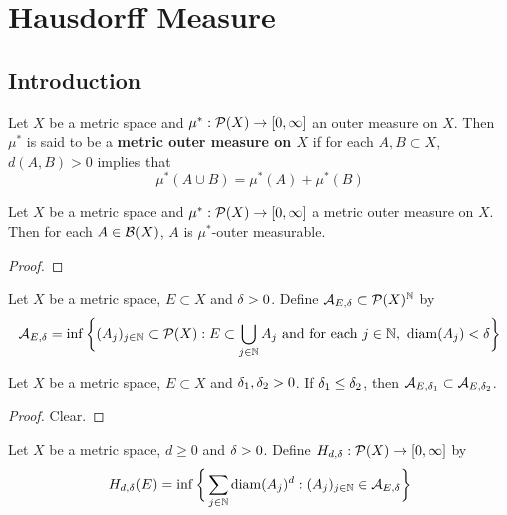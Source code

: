 \documentclass{book}
\begin{document}
	
	
	
	
	
	\newpage
	\chapter{Hausdorff Measure}
	
	\section{Introduction}
	
	\begin{defn}
	Let $X$ be a metric space and $\mu^*: \mathcal{P}(X) \rightarrow [0, \infty]$ an outer measure on $X$. Then $\mu^*$ is said to be a \textbf{metric outer measure on $X$} if for each $A, B \subset X$, $d(A,B) > 0$ implies that 
	\begin{equation*}
	\mu^*(A \cup B) = \mu^*(A) + \mu^*(B)
	\end{equation*}
	\end{defn}	
	
	\begin{ex}
	Let $X$ be a metric space and $\mu^*: \mathcal{P}(X) \rightarrow [0, \infty]$ a metric outer measure on $X$.
	Then for each $A \in \mathcal{B}(X)$, $A$ is $\mu^*$-outer measurable. 
	\end{ex}
	
	\begin{proof}
	
	\end{proof}
	
	
	\begin{defn}
	Let $X$ be a metric space, $E \subset X$ and $\delta >0$. Define $\mathcal{A}_{E, \delta} \subset \mathcal{P}(X)^{\mathbb{N}}$ by 
	\begin{equation*}
	 \mathcal{A}_{E, \delta} = \inf \bigg \{(A_j)_{j \in \mathbb{N}} \subset \mathcal{P}(X): E \subset \bigcup\limits_{j \in \mathbb{N}}A_j \text{ and for each $j \in \mathbb{N}$, } \operatorname{\text{diam}}(A_j) < \delta \bigg \}
	\end{equation*}
	\end{defn}
	
	\begin{ex}
	Let $X$ be a metric space, $E \subset X$ and $\delta_1, \delta_2 >0$. If $\delta_1 \leq \delta_2$, then $\mathcal{A}_{E, \delta_1} \subset \mathcal{A}_{E, \delta_2}$.
	\end{ex}
	
	\begin{proof}
	Clear.
	\end{proof}
	
	\begin{defn}
	Let $X$ be a metric space, $d \geq 0$ and $\delta >0$. Define $H_{d, \delta}: \mathcal{P}(X) \rightarrow [0, \infty]$ by 
	\begin{equation*}
	H_{d, \delta}(E) = \inf \bigg \{\sum\limits_{j \in \mathbb{N}} \operatorname{\text{diam}}(A_j)^d: (A_j)_{j \in \mathbb{N}} \in \mathcal{A}_{E, \delta} \bigg \}
	\end{equation*}
	\end{defn}
	
\end{document}
